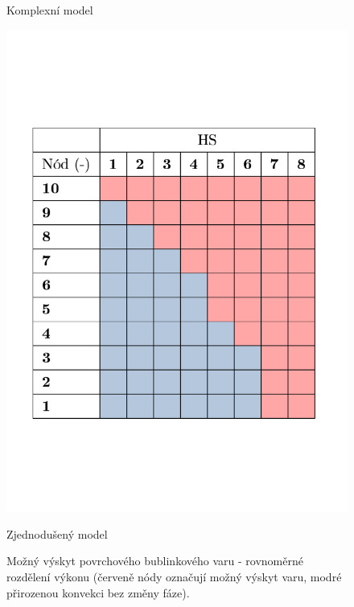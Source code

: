 \begin{figure}[H]
\begin{minipage}{.5\textwidth}
		\caption{Komplexní model}
		\label{fig:var_komplex_rovn}
	\end{minipage}%
	\begin{minipage}{.5\textwidth}
		\centering
		\includegraphics[width=\textwidth, trim={1cm 5.5cm 0.5cm 6cm}, clip]{./04_TH_model_IRT/grafy/var_rovn_jedno.pdf}
		\caption{Zjednodušený model}
		\label{fig:var_jedno_rovn}
	\end{minipage}
\caption{Možný výskyt povrchového bublinkového varu - rovnoměrné rozdělení výkonu (červeně nódy označují možný výskyt varu, modré přirozenou konvekci bez změny fáze).}
\label{fig:var_rovn}
\end{figure}

